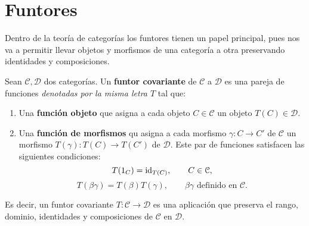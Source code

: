 \section{Funtores}

Dentro de la teoría de categorías los funtores tienen un papel principal, pues nos va a permitir llevar objetos y morfismos de una categoría a otra preservando identidades y composiciones.

\begin{definicion}
	Sean $\mathcal{C}, \mathcal{D}$ dos categorías. Un \textbf{funtor covariante} de $\mathcal{C}$ a $\mathcal{D}$ es una pareja de funciones \textit{denotadas por la misma letra $T$} tal que:
	\begin{enumerate}
		\item Una \textbf{función objeto} que asigna a cada objeto $C \in \mathcal{C}$ un objeto $T(C) \in \mathcal{D}$.
		\item Una \textbf{función de morfismos} qu asigna a cada morfismo $\gamma: C \rightarrow C'$ de $\mathcal{C}$ un morfismo $T(\gamma): T(C) \rightarrow T(C')$ de $\mathcal{D}$. Este par de funciones satisfacen las siguientes condiciones:
		\begin{equation}
			T(1_C) = \operatorname{id}_{T(C)}, \qquad C \in \mathcal{C},
		\end{equation}
		\begin{equation}
			T(\beta \gamma) = T(\beta)T(\gamma), \qquad \beta \gamma \text{ definido en } \mathcal{C}.
		\end{equation}
	\end{enumerate}
\end{definicion}

Es decir, un funtor covariante $T: \mathcal{C} \rightarrow \mathcal{D}$ es una aplicación que preserva el rango, dominio, identidades y composiciones de $\mathcal{C}$ en $\mathcal{D}$.


\endinput
